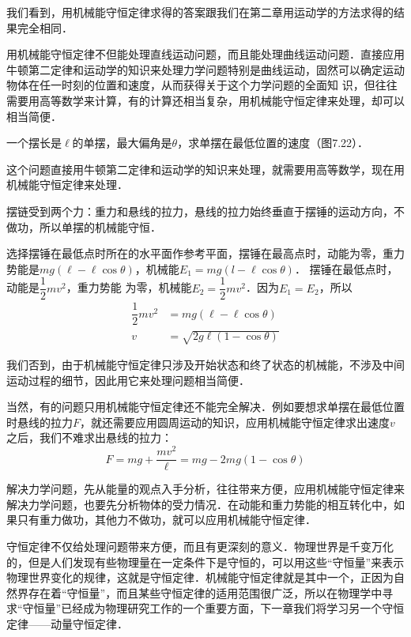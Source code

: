 我们看到，用机械能守恒定律求得的答案跟我们在第二章用运动学的方法求得的结果完全相同．

用机械能守恒定律不但能处理直线运动问题，而且能处理曲线运动问题．直接应用牛顿第二定律和运动学的知识来处理力学问题特别是曲线运动，固然可以确定运动物体在任一时刻的位置和速度，从而获得关于这个力学问题的全面知
识，但往往需要用高等数学来计算，有的计算还相当复杂，用机械能守恒定律来处理，却可以相当简便．


\begin{example}
    一个摆长是$\ell$的单摆，最大偏角是$\theta$，求单摆在最低位置的速度（图7.22）．
\end{example}


\begin{solution}
    这个问题直接用牛顿第二定律和运动学的知识来处理，就需要用高等数学，现在用机械能守恒定律来处理．

摆链受到两个力：重力和悬线的拉力，悬线的拉力始终垂直于摆锤的运动方向，不做功，所以单摆的机械能守恒．

选择摆锤在最低点时所在的水平面作参考平面，摆锤在最高点时，动能为零，重力势能是$mg(\ell-\ell\cos\theta)$，机械能$E_1=mg(l-\ell\cos\theta)$． 摆锤在最低点时，动能是$\dfrac{1}{2}mv^2$，重力势能
为零，机械能$E_2=\dfrac{1}{2}mv^2$．因为$E_1=E_2$，所以
\[\begin{split}
    \dfrac{1}{2}mv^2&=mg(\ell-\ell\cos\theta)\\
    v&=\sqrt{2g\ell(1-\cos\theta)}
\end{split}\]
\end{solution}

我们否到，由于机械能守恒定律只涉及开始状态和终了状态的机械能，不涉及中间运动过程的细节，因此用它来处理问题相当简便．

当然，有的问题只用机械能守恒定律还不能完全解决．例如要想求单摆在最低位置时悬线的拉力$F$，就还需要应用圆周运动的知识，应用机械能守恒定律求出速度$v$之后，我们不难求出悬线的拉力：
\[F=mg+\frac{mv^2}{\ell}=mg-2mg (1-\cos\theta)\]

解决力学问题，先从能量的观点入手分析，往往带来方便，应用机械能守恒定律来解决力学问题，也要先分析物体的受力情况．在动能和重力势能的相互转化中，如果只有重力做功，其他力不做功，就可以应用机械能守恒定律．

守恒定律不仅给处理问题带来方便，而且有更深刻的意义．物理世界是千变万化的，但是人们发现有些物理量在一定条件下是守恒的，可以用这些“守恒量”来表示物理世界变化的规律，这就是守恒定律．机械能守恒定律就是其中一个，正因为自然界存在着“守恒量”，而且某些守恒定律的适用范围很广泛，所以在物理学中寻求“守恒量”已经成为物理研究工作的一个重要方面，下一章我们将学习另一个守恒定律——动量守恒定律．

